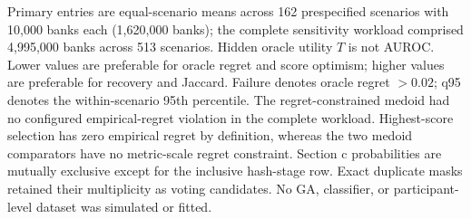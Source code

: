 \begin{table}[H]
\begin{minipage}{0.98\linewidth}\scriptsize\vspace{0.35em}
Primary entries are equal-scenario means across 162 prespecified scenarios with 10,000 banks each (1,620,000 banks); the complete sensitivity workload comprised 4,995,000 banks across 513 scenarios. Hidden oracle utility $T$ is not AUROC. Lower values are preferable for oracle regret and score optimism; higher values are preferable for recovery and Jaccard. Failure denotes oracle regret $>0.02$; q95 denotes the within-scenario 95th percentile. The regret-constrained medoid had no configured empirical-regret violation in the complete workload. Highest-score selection has zero empirical regret by definition, whereas the two medoid comparators have no metric-scale regret constraint. Section c probabilities are mutually exclusive except for the inclusive hash-stage row. Exact duplicate masks retained their multiplicity as voting candidates. No GA, classifier, or participant-level dataset was simulated or fitted.
\end{minipage}
\end{table}

